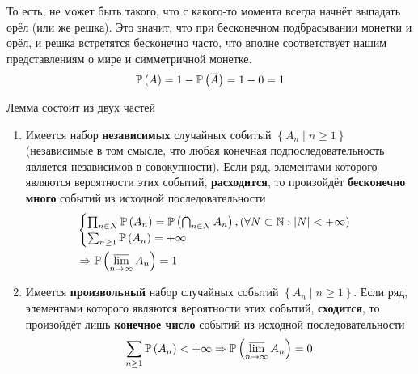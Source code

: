     То есть, не может быть такого, что с какого-то момента
    всегда начнёт выпадать орёл (или же решка).
    Это значит, что при бесконечном подбрасывании монетки
    и орёл, и решка встретятся бесконечно часто,
    что вполне соответствует нашим представлениям о мире и симметричной монетке.
    $$\mathbb{P}\left( A \right)=1-\mathbb{P}\left( \overline{A} \right)=1-0=1$$
\begin{lemma}Лемма состоит из двух частей
\begin{enumerate}[label=\alph*]
    \item Имеется набор \textbf{независимых} случайных собитый
        $\left\{ A_n\mid n\ge1 \right\}$ (независимые в том смысле, что любая
        конечная подпоследовательность является независимов в совокупности).
        Если ряд, элементами которого являются вероятности этих событий,
        \textbf{расходится}, то произойдёт \textbf{бесконечно много}
        событий из исходной последовательности
        \begin{align*}
        &\begin{cases}
            \prod_{n\in N}\mathbb{P}\left( A_n \right)
            =\mathbb{P}\left( \bigcap_{n\in N}A_n \right),
            (\forall N\subset\mathbb{N}: \left|N\right|<+\infty)\\
            \sum_{n\ge 1}\mathbb{P}\left( A_n \right) = +\infty
        \end{cases}\\
        &\Rightarrow \mathbb{P}\left( \varlimsup\limits_{n\to\infty} A_n \right)=1
        \end{align*}
    \item Имеется \textbf{произвольный} набор случайных событий
        $\left\{ A_n\mid n\ge1 \right\}$.
        Если ряд, элементами которого являются вероятности этих событий,
        \textbf{сходится}, то произойдёт лишь \textbf{конечное число}
        событий из исходной последовательности
        $$\sum_{n\ge 1}\mathbb{P}\left( A_n \right) < +\infty
            \Rightarrow \mathbb{P}\left( \varlimsup\limits_{n\to\infty} A_n \right)=0$$
\end{enumerate}
\end{lemma}
